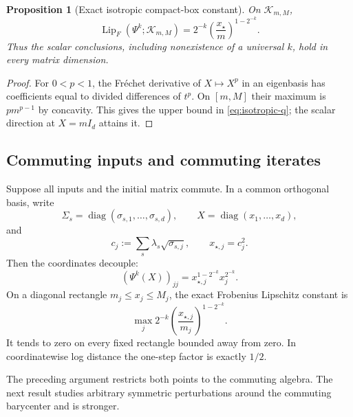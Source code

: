 \documentclass[11pt]{article}
\newtheorem{proposition}[theorem]{Proposition}
\theoremstyle{definition}
\newcommand{\Id}{I_d}
\newcommand{\diag}{\operatorname{diag}}
\newcommand{\Lip}{\operatorname{Lip}}
\newcommand{\cK}{\mathcal K}
\begin{document}
\begin{proposition}[Exact isotropic compact-box constant]
On $\cK_{m,M}$,
\begin{equation}\label{eq:isotropic-q}
 \Lip_F(\Psi^k;\cK_{m,M})
 =2^{-k}\left(\frac{x_\star}{m}\right)^{1-2^{-k}}.
\end{equation}
Thus the scalar conclusions, including nonexistence of a universal $k$, hold
in every matrix dimension.
\end{proposition}

\begin{proof}
For $0<p<1$, the Fr\'echet derivative of $X\mapsto X^p$ in an eigenbasis has
coefficients equal to divided differences of $t^p$.  On $[m,M]$ their maximum
is $pm^{p-1}$ by concavity.  This gives the upper bound in
\eqref{eq:isotropic-q}; the scalar direction at $X=m\Id$ attains it.
\end{proof}

\subsection{Commuting inputs and commuting iterates}

Suppose all inputs and the initial matrix commute.  In a common orthogonal
basis, write
\[
 \Sigma_s=\diag(\sigma_{s,1},\ldots,\sigma_{s,d}),\qquad
 X=\diag(x_1,\ldots,x_d),
\]
and
\begin{equation}\label{eq:commuting-cj}
 c_j:=\sum_s\lambda_s\sqrt{\sigma_{s,j}},
 \qquad x_{\star,j}=c_j^2.
\end{equation}
Then the coordinates decouple:
\begin{equation}\label{eq:commuting-iterate}
 (\Psi^k(X))_{jj}=x_{\star,j}^{1-2^{-k}}x_j^{2^{-k}}.
\end{equation}
On a diagonal rectangle $m_j\leq x_j\leq M_j$, the exact Frobenius
Lipschitz constant is
\begin{equation}\label{eq:commuting-q}
 \max_j 2^{-k}
 \left(\frac{x_{\star,j}}{m_j}\right)^{1-2^{-k}}.
\end{equation}
It tends to zero on every fixed rectangle bounded away from zero.  In
coordinatewise log distance the one-step factor is exactly $1/2$.

The preceding argument restricts both points to the commuting algebra.  The
next result studies arbitrary symmetric perturbations around the commuting
barycenter and is stronger.
\end{document}
